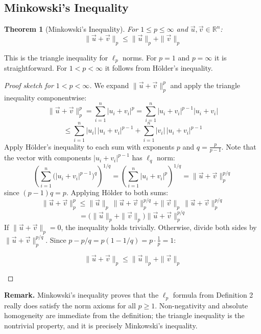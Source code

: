 \documentclass[10pt, twocolumn]{article}
\theoremstyle{definition}
\theoremstyle{plain}
\newtheorem{theorem}{Theorem}
\newcommand{\RR}{\mathbb{R}}
\begin{document}
\subsection{Minkowski's Inequality}

\begin{tcolorbox}
\begin{theorem}[Minkowski's Inequality]
For $1 \le p \le \infty$ and $\vec{u}, \vec{v} \in \RR^n$:
\[
    \|\vec{u} + \vec{v}\|_p \le \|\vec{u}\|_p + \|\vec{v}\|_p
\]
\end{theorem}
\end{tcolorbox}

This is the triangle inequality for $\ell_p$ norms. For $p = 1$ and $p = \infty$ it is straightforward. For $1 < p < \infty$ it follows from H\"{o}lder's inequality.

\begin{proof}[Proof sketch for $1 < p < \infty$]
We expand $\|\vec{u} + \vec{v}\|_p^p$ and apply the triangle inequality componentwise:
\[
    \|\vec{u} + \vec{v}\|_p^p = \sum_{i=1}^{n} |u_i + v_i|^p = \sum_{i=1}^{n} |u_i + v_i|^{p-1} |u_i + v_i|
\]
\[
    \le \sum_{i=1}^{n} |u_i| \, |u_i + v_i|^{p-1} + \sum_{i=1}^{n} |v_i| \, |u_i + v_i|^{p-1}
\]
Apply H\"{o}lder's inequality to each sum with exponents $p$ and $q = \frac{p}{p-1}$. Note that the vector with components $|u_i + v_i|^{p-1}$ has $\ell_q$ norm:
\[
    \left(\sum_{i=1}^{n} \bigl(|u_i + v_i|^{p-1}\bigr)^q\right)^{1/q} = \left(\sum_{i=1}^{n} |u_i + v_i|^p\right)^{1/q} = \|\vec{u} + \vec{v}\|_p^{p/q}
\]
since $(p-1)q = p$. Applying H\"{o}lder to both sums:
\[
    \|\vec{u} + \vec{v}\|_p^p \le \|\vec{u}\|_p \, \|\vec{u} + \vec{v}\|_p^{p/q} + \|\vec{v}\|_p \, \|\vec{u} + \vec{v}\|_p^{p/q}
\]
\[
    = \bigl(\|\vec{u}\|_p + \|\vec{v}\|_p\bigr) \|\vec{u} + \vec{v}\|_p^{p/q}
\]
If $\|\vec{u} + \vec{v}\|_p = 0$, the inequality holds trivially. Otherwise, divide both sides by $\|\vec{u} + \vec{v}\|_p^{p/q}$. Since $p - p/q = p(1 - 1/q) = p \cdot \frac{1}{p} = 1$:
\begin{result}
\[
    \|\vec{u} + \vec{v}\|_p \le \|\vec{u}\|_p + \|\vec{v}\|_p
\]
\end{result}
\end{proof}

\begin{tcolorbox}[colframe=black!50]
\textbf{Remark.} Minkowski's inequality proves that the $\ell_p$ formula from Definition 2 really does satisfy the norm axioms for all $p \ge 1$. Non-negativity and absolute homogeneity are immediate from the definition; the triangle inequality is the nontrivial property, and it is precisely Minkowski's inequality.
\end{tcolorbox}
\end{document}
